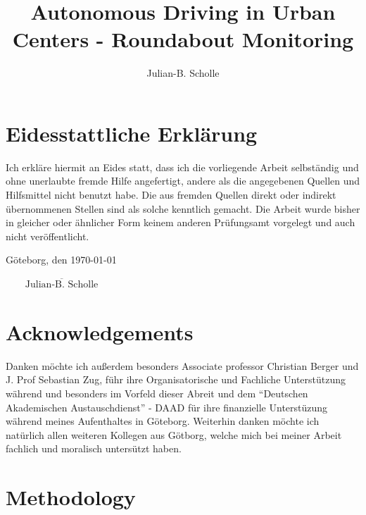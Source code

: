 \documentclass[11pt,oneside,openright]{mpreport}
\title{Autonomous Driving in Urban Centers - Roundabout Monitoring}
\author{Julian-B. Scholle}
\begin{document}
\maketitle



\chapter*{Eidesstattliche Erklärung}
Ich erkläre hiermit an Eides statt, dass ich die vorliegende Arbeit selbständig und
ohne unerlaubte fremde Hilfe angefertigt, andere als die angegebenen Quellen und
Hilfsmittel nicht benutzt habe. Die aus fremden Quellen direkt oder indirekt
übernommenen Stellen sind als solche kenntlich gemacht.
Die Arbeit wurde bisher in gleicher oder ähnlicher Form keinem anderen
Prüfungsamt vorgelegt und auch nicht veröffentlicht.

\noindent Göteborg, den \today
\begin{flushright}
$\overline{~~~~~~~~~\mbox{Julian-B. Scholle}~~~~~~~~~}$
\end{flushright}


\chapter*{Acknowledgements}
Danken möchte ich außerdem besonders Associate professor Christian Berger und J. Prof Sebastian Zug, führ ihre Organisatorische und Fachliche Unterstützung während und besonders im Vorfeld dieser Abreit und
dem ``Deutschen Akademischen Austauschdienst'' - DAAD für ihre finanzielle Unterstüzung während meines Aufenthaltes in Göteborg.
Weiterhin danken möchte ich natürlich allen weiteren Kollegen aus Götborg, welche mich bei meiner Arbeit fachlich und moralisch untersützt haben.

\tableofcontents




\chapter{Methodology}
\end{document}
